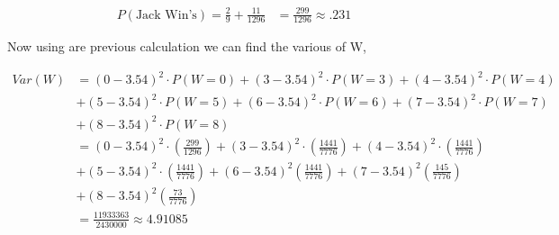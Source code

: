 \documentclass{article}
\numberwithin{equation}{section}
\newcommand{\Z}{&=}
\newcommand{\eqname}[1]{\tag*{#1}}%
\begin{document}
\begin{align}
    P(\text{Jack Win's}) = \frac{2}{9} + \frac{11}{1296} 
    \Z \frac{299}{1296} \approx .231
\end{align}

\pagebreak

Now using are previous calculation we can find the various of W,

\begin{align}
        Var(W) &= (0-3.54)^2 \cdot P(W=0)+ (3-3.54)^2\cdot P(W=3)+ (4-3.54)^2\cdot P(W=4) \eqname{} \\
       & + (5-3.54)^2 \cdot P(W=5) + (6-3.54)^2\cdot P(W=6) + (7-3.54)^2 \cdot P(W=7) \eqname{} \\
       & + (8-3.54)^2\cdot P(W=8)\eqname{} \\
       \Z (0-3.54)^2\cdot \left( \frac{299}{1296}\right) + (3-3.54)^2\cdot \left( \frac{1441}{7776}\right)+ 
        (4-3.54)^2\cdot \left( \frac{1441}{7776}\right)  \eqname{} \\& + (5-3.54)^2\cdot \left(  \frac{1441}{7776}\right) + (6-3.54)^2 \left( \frac{1441}{7776} \right) + (7-3.54)^2 \left( \frac{145}{7776} \right) \eqname{} \\ & + (8-3.54)^2 \left( \frac{73}{7776} \right) \eqname{} \\
        \Z \frac{11933363}{2430000} \approx 4.91085
\end{align}
\end{document}
